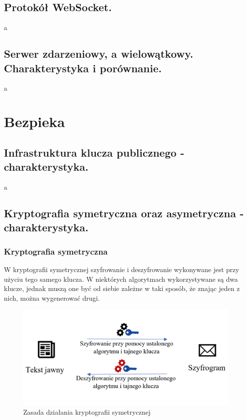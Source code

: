 \documentclass[a4paper,12pt,oneside]{book}
\begin{document}
			\newpage\subsection{\color{red}Protokół WebSocket.}
				a
			\newpage\subsection{\color{red}Serwer zdarzeniowy, a wielowątkowy. Charakterystyka i porównanie.}
				a
		
		\newpage\section{Bezpieka}
			\subsection{\color{red}Infrastruktura klucza publicznego - charakterystyka.}
				a
			
			\newpage\subsection{Kryptografia symetryczna oraz asymetryczna - charakterystyka.}
				
				\subsubsection*{Kryptografia symetryczna}
				
				W kryptografii symetrycznej szyfrowanie i deszyfrowanie wykonywane jest przy użyciu tego samego klucza. W niektórych algorytmach wykorzystywane są dwa klucze, jednak muszą one być od siebie zależne w taki sposób, że znając jeden z nich, można wygenerować drugi.
				
				\begin{figure}[h!]
					\centering\includegraphics[scale=0.45]{krypt_sym.png}
					\caption{Zasada działania kryptografii symetrycznej}
				\end{figure}
				
\end{document}
